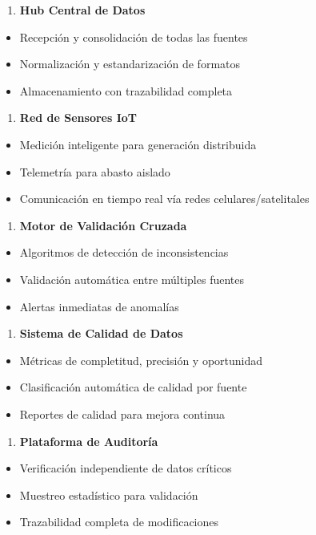 \documentclass{cel}
\begin{document}
\begin{enumerate}
\item \textbf{Hub Central de Datos}
\end{enumerate}
\begin{itemize}
\item Recepción y consolidación de todas las fuentes
\item Normalización y estandarización de formatos
\item Almacenamiento con trazabilidad completa
\end{itemize}
\begin{enumerate}
\item \textbf{Red de Sensores IoT}
\end{enumerate}
\begin{itemize}
\item Medición inteligente para generación distribuida
\item Telemetría para abasto aislado
\item Comunicación en tiempo real vía redes celulares/satelitales
\end{itemize}
\begin{enumerate}
\item \textbf{Motor de Validación Cruzada}
\end{enumerate}
\begin{itemize}
\item Algoritmos de detección de inconsistencias
\item Validación automática entre múltiples fuentes
\item Alertas inmediatas de anomalías
\end{itemize}
\begin{enumerate}
\item \textbf{Sistema de Calidad de Datos}
\end{enumerate}
\begin{itemize}
\item Métricas de completitud, precisión y oportunidad
\item Clasificación automática de calidad por fuente
\item Reportes de calidad para mejora continua
\end{itemize}
\begin{enumerate}
\item \textbf{Plataforma de Auditoría}
\end{enumerate}
\begin{itemize}
\item Verificación independiente de datos críticos
\item Muestreo estadístico para validación
\item Trazabilidad completa de modificaciones

\end{itemize}
\end{document}
